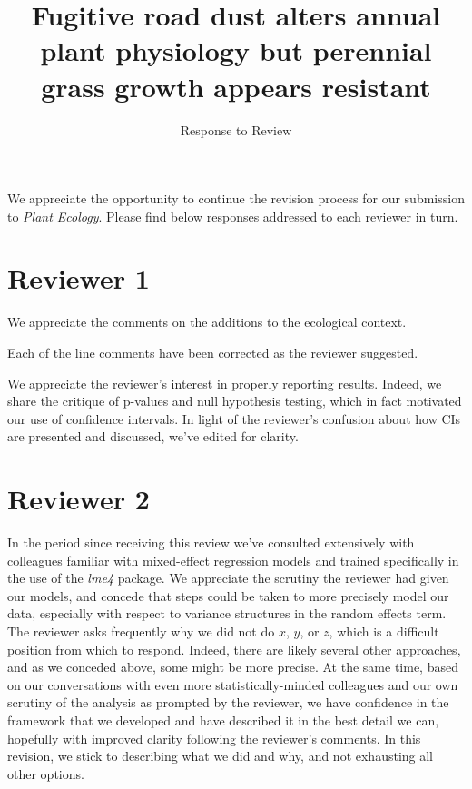 \documentclass[parskip=half]{scrartcl}
\title{\Large Fugitive road dust alters annual plant physiology but perennial grass growth appears resistant}
\subtitle{Response to Review}
\author{ }
\date{}
\begin{document}
\maketitle

\vspace{-2cm} 

We appreciate the opportunity to continue the revision process for our submission to \emph{Plant Ecology}. 
Please find below responses addressed to each reviewer in turn. 


\section*{Reviewer 1}

We appreciate the comments on the additions to the ecological context. 

Each of the line comments have been corrected as the reviewer suggested. 

We appreciate the reviewer's interest in properly reporting results. 
Indeed, we share the critique of p-values and null hypothesis testing, which in fact motivated our use of confidence intervals. 
In light of the reviewer's confusion about how CIs are presented and discussed, we've edited for clarity.

\section*{Reviewer 2}

In the period since receiving this review we've consulted extensively with colleagues familiar with mixed-effect regression models and trained specifically in the use of the \emph{lme4} package. 
We appreciate the scrutiny the reviewer had given our models, and concede that steps could be taken to more precisely model our data, especially with respect to variance structures in the random effects term. 
The reviewer asks frequently why we did not do $x$, $y$, or $z$, which is a difficult position from which to respond. 
Indeed, there are likely several other approaches, and as we conceded above, some might be more precise. 
At the same time, based on our conversations with even more statistically-minded colleagues and our own scrutiny of the analysis as prompted by the reviewer, we have confidence in the framework that we developed and have described it in the best detail we can, hopefully with improved clarity following the reviewer's comments. 
In this revision, we stick to describing what we did and why, and not exhausting all other options. 
\end{document}
